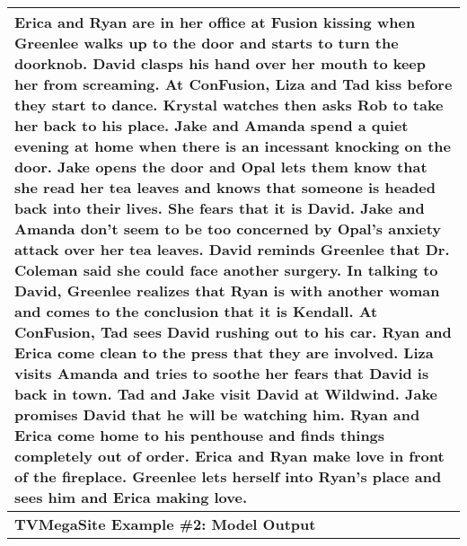 \begin{table}[!htbp]
\begin{tabular}{p{\linewidth}}
Erica and Ryan are in her office at Fusion kissing when Greenlee walks up to the door and starts to turn the doorknob. David clasps his hand over her mouth to keep her from screaming. At ConFusion, Liza and Tad kiss before they start to dance. Krystal watches then asks Rob to take her back to his place. Jake and Amanda spend a quiet evening at home when there is an incessant knocking on the door. Jake opens the door and Opal lets them know that she read her tea leaves and knows that someone is headed back into their lives. She fears that it is David. Jake and Amanda don't seem to be too concerned by Opal's anxiety attack over her tea leaves. David reminds Greenlee that Dr. Coleman said she could face another surgery. In talking to David, Greenlee realizes that Ryan is with another woman and comes to the conclusion that it is Kendall. At ConFusion, Tad sees David rushing out to his car. Ryan and Erica come clean to the press that they are involved. Liza visits Amanda and tries to soothe her fears that David is back in town. Tad and Jake visit David at Wildwind. Jake promises David that he will be watching him. Ryan and Erica come home to his penthouse and finds things completely out of order. Erica and Ryan make love in front of the fireplace. Greenlee lets herself into Ryan's place and sees him and Erica making love.
    \\
    \midrule
    \textbf{TVMegaSite Example \#2: Model Output} \\
    \midrule

\end{tabular}
\end{table}

